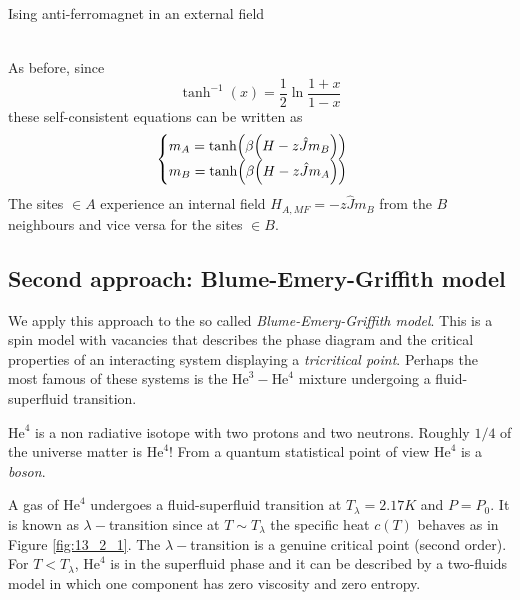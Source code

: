 \documentclass[../main/main.tex]{subfiles}
\begin{document}
\begin{example}{Ising anti-ferromagnet in an external field}{}
\begin{itemize}
\begin{subequations*}
\begin{align*}
\end{align*}
\end{subequations*}
As before, since
\begin{equation*}
  \tanh^{-1} (x) = \frac{1}{2} \ln{\frac{1+x}{1-x}}
\end{equation*}
these self-consistent equations can be written as
\begin{equation}
  \begin{cases}
   m_A = \tanh ( \beta \qty(H - z \hat{J} m_B ) )\\
   m_B = \tanh ( \beta \qty(H - z \hat{J} m_A ) )
  \end{cases}
\end{equation}
The sites \( \in A \) experience an internal field \( H_{A,MF} = - z \hat{J} m_B \) from the \( B \) neighbours and vice versa for the sites \( \in B \).
\end{itemize}
\end{example}

\subsection{Second approach: Blume-Emery-Griffith model}
We apply this approach to the so called \emph{Blume-Emery-Griffith model}.
This is a spin model with vacancies that describes the phase diagram and the critical properties of an interacting system displaying a \emph{tricritical point}. Perhaps the most famous of these systems is the \( \text{He}^3-\text{He}^4 \) mixture undergoing a fluid-superfluid transition.

\begin{remark}
\( \text{He}^4 \)  is a non radiative isotope with two protons and two neutrons. Roughly \( 1/4 \) of the universe matter is \( \text{He}^4 \)!
From a quantum statistical point of view \( \text{He}^4 \) is a \emph{boson}.
\end{remark}

 A gas of \( \text{He}^4 \) undergoes a fluid-superfluid transition at \( T_ \lambda =2.17 K \) and \( P=P_0 \). It is known as \( \lambda - \)transition since at \( T \sim T_ \lambda  \)  the specific heat \( c(T) \) behaves as in Figure \ref{fig:13_2_1}.
The \( \lambda - \)transition is a genuine critical point (second order). For \( T < T_{\lambda } \), \( \text{He}^4 \)  is in the superfluid phase and it can be described by a two-fluids model in which one component has zero viscosity and zero entropy.
\end{document}
